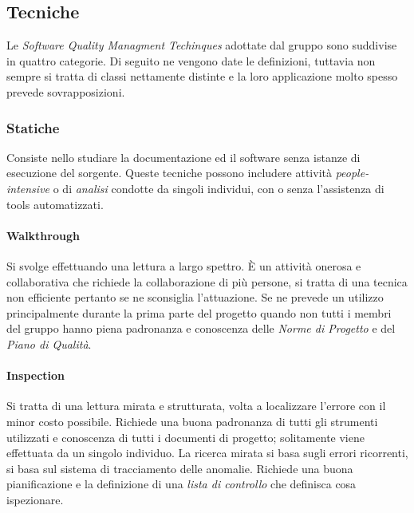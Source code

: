 	\subsection{Tecniche}
	Le \emph{Software Quality Managment Techinques} adottate dal gruppo sono suddivise in quattro categorie. Di seguito ne vengono date le definizioni, tuttavia non sempre si tratta di classi nettamente distinte e la loro applicazione molto spesso prevede sovrapposizioni.
	
		\subsubsection{Statiche}
		Consiste nello studiare la documentazione ed il software senza istanze di esecuzione del sorgente. Queste tecniche possono includere attività \emph{people-intensive} o di \emph{analisi} condotte da singoli individui, con o senza l'assistenza di tools automatizzati.
			\paragraph{Walkthrough}
			Si svolge effettuando una lettura a largo spettro. È un attività onerosa e collaborativa che richiede la collaborazione di più persone, si tratta di una tecnica non efficiente pertanto se ne sconsiglia l'attuazione. Se ne prevede un utilizzo principalmente durante la prima parte del progetto quando non tutti i membri del gruppo hanno piena padronanza e conoscenza delle \emph{Norme di Progetto} e del \emph{Piano di Qualità}.
			\paragraph{Inspection}
			Si tratta di una lettura mirata e strutturata, volta a localizzare l'errore con il minor costo possibile. Richiede una buona padronanza di tutti gli strumenti utilizzati e conoscenza di tutti i documenti di progetto; solitamente viene effettuata da un singolo individuo.
			La ricerca mirata si basa sugli errori ricorrenti, si basa sul sistema di tracciamento delle anomalie. Richiede una buona pianificazione e la definizione di una \emph{lista di controllo} che definisca cosa ispezionare.
			
